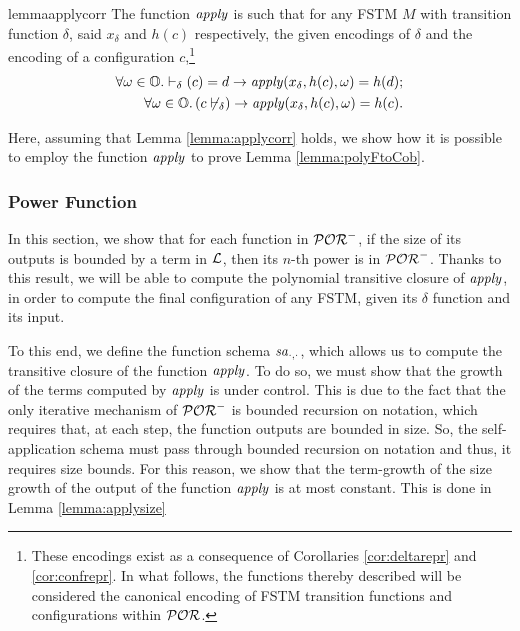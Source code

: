 \begin{restatable}{lemma}{applycorr}
  \label{lemma:applycorr}
  The function $\mathit{apply}$ is such that for any FSTM $M$ with transition function
  $\delta$, said $x_\delta$ and $h(c)$ respectively, the given encodings
  of $\delta$ and the encoding of a configuration $c$,\footnote{These encodings
  exist as a consequence of Corollaries
  \ref{cor:deltarepr} and \ref{cor:confrepr}. In what follows, the
  functions thereby described will be considered the canonical encoding of
  FSTM transition functions and configurations within $\mathcal{POR}$.}
  \begin{align*}
    \forall \omega \in \mathbb{O}.\vdash_\delta(c)=d \to \mathit{apply}(x_\delta, h(c), \omega) = h(d);\\
    \forall \omega \in \mathbb{O}. \left(c \not\vdash_\delta\right ) \to \mathit{apply}(x_\delta, h(c), \omega) = h(c).
  \end{align*}
\end{restatable}
%
\noindent
%
Here, assuming that Lemma \ref{lemma:applycorr} holds, we show how it is possible
to employ the function $\mathit{apply}$ to prove Lemma \ref{lemma:polyFtoCob}.

\subsubsection{Power Function}
\label{subsub:pf}

In this section, we show that for each function in $\mathcal{POR}^-$, if
the size of its outputs
is bounded by a term in $\mathcal{L}$, then its $n$-th power is in $\mathcal{POR}^-$.
%
Thanks to this result, we will be able to compute the polynomial transitive
closure of $\mathit{apply}$, in order to compute the final configuration
of any FSTM, given its $\delta$ function and its input.

To this end, we define the function schema $\mathit{sa}_{\cdot,\cdot}$,
which allows us to compute
the transitive closure of the function $\mathit{apply}$. To do so,
we must show that the growth of the terms computed by $\mathit{apply}$
is under control. This is due to the fact that the only iterative
mechanism of $\mathcal{POR}^-$ is bounded recursion on notation, which
requires that, at each step, the function outputs are bounded in size.
%
So, the self-application schema must pass through bounded recursion on notation
and thus, it requires size bounds. For this reason, we show that the term-growth
of the size growth of the output of the function $\mathit{apply}$ is at most constant.
This is done in Lemma \ref{lemma:applysize}

